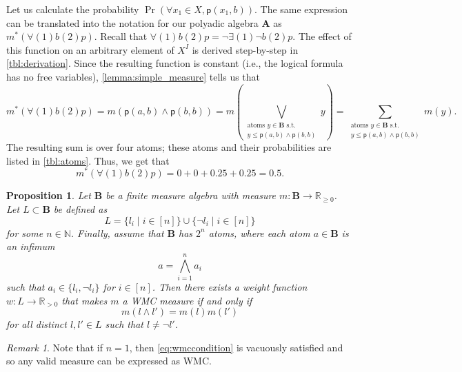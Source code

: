 \documentclass{article}
\newtheorem{proposition}{Proposition}
\theoremstyle{definition}
\theoremstyle{remark}
\newtheorem*{remark}{Remark}
\begin{document}
Let us calculate the probability $\Pr(\forall x_1 \in X, \mathsf{p}(x_1, b))$.
The same expression can be translated into the notation for our polyadic algebra
$\mathbf{A}$ as $m^*(\bm\forall(1)b(2)p)$. Recall that $\bm\forall(1)b(2)p =
\neg\bm\exists(1)\neg b(2)p$. The effect of this function on an arbitrary
element of $X^I$ is derived step-by-step in \cref{tbl:derivation}. Since the
resulting function is constant (i.e., the logical formula has no free
variables), \cref{lemma:simple_measure} tells us that
\[
  m^*(\bm\forall(1)b(2)p) = m(\mathsf{p}(a, b) \land \mathsf{p}(b, b)) = m
  \left( \bigvee_{\substack{\text{atoms } y \in \mathbf{B} \text{ s.t.}\\
        y \le \mathsf{p}(a, b) \land \mathsf{p}(b, b)}} y \right) = \sum
  _{\substack{\text{atoms } y \in \mathbf{B} \text{ s.t.}\\
      y \le \mathsf{p}(a, b) \land \mathsf{p}(b, b)}} m(y).
\]
The resulting sum is over four atoms; these atoms and their probabilities are
listed in \cref{tbl:atoms}. Thus, we get that
\[
  m^*(\bm\forall(1)b(2)p) = 0 + 0 + 0.25 + 0.25 = 0.5.
\]

\begin{proposition}
  Let $\mathbf{B}$ be a finite measure algebra with measure $m : \mathbf{B} \to
  \mathbb{R}_{\ge 0}$. Let $L \subset \mathbf{B}$ be defined as
  \[
  L = \{ l_i \mid i \in [n] \} \cup \{ \neg l_i \mid i \in [n] \}
  \]
  for some $n \in \mathbb{N}$. Finally, assume that $\mathbf{B}$ has $2^n$
  atoms, where each atom $a \in \mathbf{B}$ is an infimum
  \[
    a = \bigwedge_{i=1}^n a_i
  \]
  such that $a_i \in \{ l_i, \neg l_i \}$ for $i \in [n]$. Then there exists a
  weight function $w : L \to \mathbb{R}_{>0}$ that makes $m$ a WMC measure if
  and only if
  \begin{equation} \label{eq:wmccondition}
  m(l \land l') = m(l)m(l')
  \end{equation}
  for all distinct $l, l' \in L$ such that $l \ne \neg l'$.
\end{proposition}

\begin{remark}
  Note that if $n = 1$, then \cref{eq:wmccondition} is vacuously satisfied and
  so any valid measure can be expressed as WMC.
\end{remark}
\end{document}
